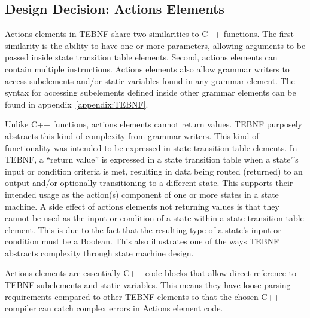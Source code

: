 \subsection{Design Decision: Actions Elements} \label{ssec:ActionsElements}
Actions elements in TEBNF share two similarities to C++ functions. The first similarity is the ability to have one or more parameters, allowing arguments to be passed inside state transition table elements.  Second, actions elements can contain multiple instructions.  Actions elements also allow grammar writers to access subelements and/or static variables found in any grammar element.  The syntax for accessing subelements defined inside other grammar elements can be found in appendix~\ref{appendix:TEBNF}.

\indent
Unlike C++ functions, actions elements cannot return values.  TEBNF purposely abstracts this kind of complexity from grammar writers.  This kind of functionality was intended to be expressed in state transition table elements.  In TEBNF, a “return value” is expressed in a state transition table when a state'’s input or condition criteria is met, resulting in data being routed (returned) to an output and/or optionally transitioning to a different state.  This supports their intended usage as the action(s) component of one or more states in a state machine.  A side effect of actions elements not returning values is that they cannot be used as the input or condition of a state within a state transition table element.  This is due to the fact that the resulting type of a state’s input or condition must be a Boolean.  This also illustrates one of the ways TEBNF abstracts complexity through state machine design.

\indent
Actions elements are essentially C++ code blocks that allow direct reference to TEBNF subelements and static variables.  This means they have loose parsing requirements compared to other TEBNF elements so that the chosen C++ compiler can catch complex errors in Actions element code.

